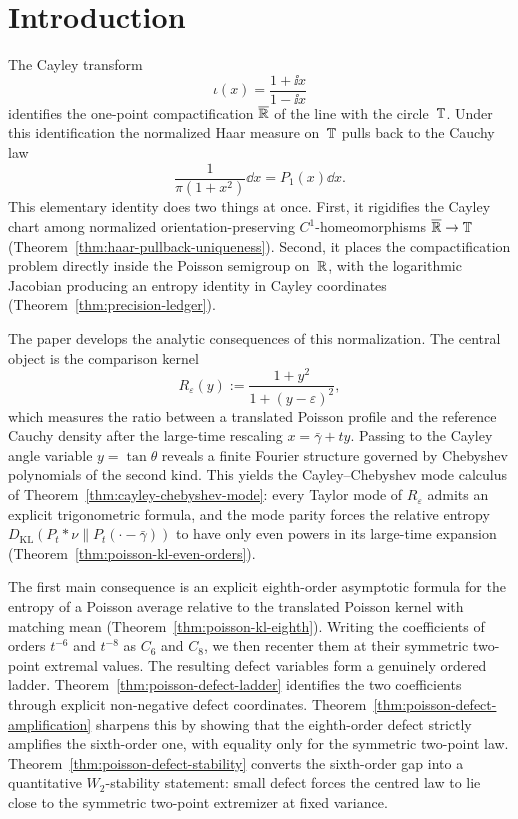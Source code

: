 \section{Introduction}\label{sec:introduction}

The Cayley transform
\[
\iota(x)=\frac{1+\ii x}{1-\ii x}
\]
identifies the one-point compactification $\overline{\mathbb{R}}$ of the line with
the circle~$\mathbb{T}$.  Under this identification the normalized Haar measure
on~$\mathbb{T}$ pulls back to the Cauchy law
\[
\frac{1}{\pi(1+x^{2})}\dd x=P_1(x)\dd x.
\]
This elementary identity does two things at once.  First, it rigidifies
the Cayley chart among normalized orientation-preserving
$C^1$-homeomorphisms $\overline{\mathbb{R}}\to\mathbb{T}$
(Theorem~\ref{thm:haar-pullback-uniqueness}).  Second, it places the
compactification problem directly inside the Poisson semigroup on~$\mathbb{R}$,
with the logarithmic Jacobian producing an entropy identity in Cayley
coordinates (Theorem~\ref{thm:precision-ledger}).

The paper develops the analytic consequences of this normalization.  The
central object is the comparison kernel
\[
R_\varepsilon(y):=\frac{1+y^2}{1+(y-\varepsilon)^2},
\]
which measures the ratio between a translated Poisson profile and the
reference Cauchy density after the large-time rescaling
$x=\bar\gamma+ty$.  Passing to the Cayley angle variable
$y=\tan\theta$ reveals a finite Fourier structure governed by Chebyshev
polynomials of the second kind.  This yields the
Cayley--Chebyshev mode calculus of
Theorem~\ref{thm:cayley-chebyshev-mode}: every Taylor mode of
$R_\varepsilon$ admits an explicit trigonometric formula, and the mode
parity forces the relative entropy
$D_{\mathrm{KL}}(P_t*\nu\|P_t(\cdot-\bar\gamma))$ to have only even
powers in its large-time expansion
(Theorem~\ref{thm:poisson-kl-even-orders}).

The first main consequence is an explicit eighth-order asymptotic
formula for the entropy of a Poisson average relative to the translated
Poisson kernel with matching mean
(Theorem~\ref{thm:poisson-kl-eighth}).  Writing the coefficients of
orders $t^{-6}$ and $t^{-8}$ as $C_6$ and $C_8$, we then recenter them
at their symmetric two-point extremal values.  The resulting defect
variables form a genuinely ordered ladder.  Theorem~\ref{thm:poisson-defect-ladder}
identifies the two coefficients through explicit non-negative defect
coordinates.  Theorem~\ref{thm:poisson-defect-amplification} sharpens
this by showing that the eighth-order defect strictly amplifies the
sixth-order one, with equality only for the symmetric two-point law.
Theorem~\ref{thm:poisson-defect-stability} converts the sixth-order gap
into a quantitative $W_2$-stability statement: small defect forces the
centred law to lie close to the symmetric two-point extremizer at fixed
variance.

